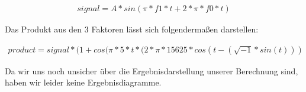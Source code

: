 \documentclass[a4paper, 12pt]{article}
\begin{document}
\begin{center}
	\begin{equation}
   
                \begin{array}{ll}
                 signal = A * sin(\pi*f1*t+2*\pi*f0*t)
                \end{array}
             
	\end{equation}
\end{center}


Das Produkt aus den 3 Faktoren l{\"a}sst sich folgendermaßen darstellen:

\begin{center}
	\begin{equation}
   
                \begin{array}{ll}
                 product = signal*(1+cos(\pi*5*t*(2*\pi*15625*cos(t-(\sqrt{-1}*sin(t)))
                \end{array}
             
	\end{equation}
\end{center}

Da wir uns noch unsicher über die Ergebnisdarstellung unserer Berechnung sind, haben wir leider keine Ergebnisdiagramme.
\end{document}
